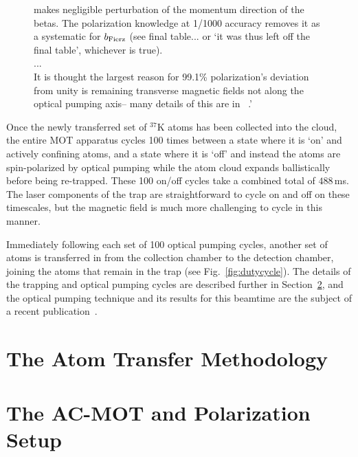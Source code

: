 \begin{figure}[h!!]
{makes negligible perturbation of the momentum direction of the betas.
The polarization knowledge at 1/1000 accuracy removes it as a systematic for $b_{\mathrm{Fierz}}$ (see final table... or `it was thus left off the final table', whichever is true).
\\...\\
It is thought the largest reason for 99.1\% polarization's deviation from unity
is remaining transverse magnetic fields not along the optical pumping axis-- many details of this are in ~\cite{thesis}.'
	}
\end{figure}

Once the newly transferred set of $^{37}\textrm{K}$ atoms has been collected into the cloud, the entire MOT apparatus cycles 100 times between a state where it is `on' and actively confining atoms, and a state where it is `off' and instead the atoms are spin-polarized by optical pumping while the atom cloud expands ballistically before being re-trapped.  These 100 on/off cycles take a combined total of $488\,$ms.  The laser components of the trap are straightforward to cycle on and off on these timescales, but the magnetic field is much more challenging to cycle in this manner.  

Immediately following each set of 100 optical pumping cycles, another set of atoms is transferred in from the collection chamber to the detection chamber, joining the atoms that remain in the trap (see Fig.~\ref{fig:dutycycle}).  The details of the trapping and optical pumping cycles are described further in Section~\ref{section:acmot_and_polarization}, and the optical pumping technique and its results for this beamtime are the subject of a recent publication~\cite{ben_OP}.


\section{The Atom Transfer Methodology}
\label{sec:swansonmethod}

\section{The AC-MOT and Polarization Setup}
\label{section:acmot_and_polarization}

